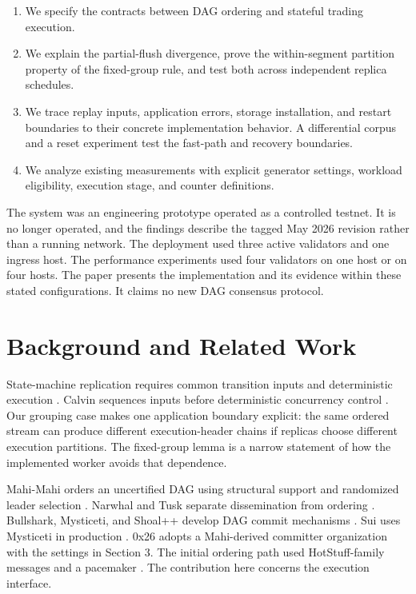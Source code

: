 \documentclass[11pt]{article}
\begin{document}
\begin{enumerate}
\item We specify the contracts between DAG ordering and stateful trading execution.
\item We explain the partial-flush divergence, prove the within-segment partition property of the fixed-group rule, and test both across independent replica schedules.
\item We trace replay inputs, application errors, storage installation, and restart boundaries to their concrete implementation behavior. A differential corpus and a reset experiment test the fast-path and recovery boundaries.
\item We analyze existing measurements with explicit generator settings, workload eligibility, execution stage, and counter definitions.
\end{enumerate}
The system was an engineering prototype operated as a controlled testnet. It is no longer operated, and the findings describe the tagged May 2026 revision rather than a running network. The deployment used three active validators and one ingress host. The performance experiments used four validators on one host or on four hosts. The paper presents the implementation and its evidence within these stated configurations. It claims no new DAG consensus protocol.

\section{Background and Related Work}
State-machine replication requires common transition inputs and deterministic execution \cite{R09}. Calvin sequences inputs before deterministic concurrency control \cite{R22}. Our grouping case makes one application boundary explicit: the same ordered stream can produce different execution-header chains if replicas choose different execution partitions. The fixed-group lemma is a narrow statement of how the implemented worker avoids that dependence.

Mahi-Mahi orders an uncertified DAG using structural support and randomized leader selection \cite{R01}. Narwhal and Tusk separate dissemination from ordering \cite{R05}. Bullshark, Mysticeti, and Shoal++ develop DAG commit mechanisms \cite{R06,R07,R21}. Sui uses Mysticeti in production \cite{R20}. 0x26 adopts a Mahi-derived committer organization \cite{R11} with the settings in Section 3. The initial ordering path used HotStuff-family messages and a pacemaker \cite{R02,R03,R04}. The contribution here concerns the execution interface.
\end{document}
